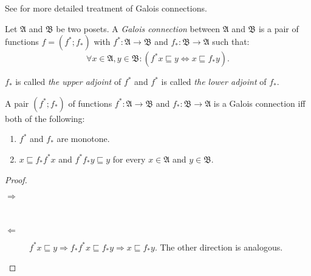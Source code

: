 See \cite{galois-and-fixed,primer-galois} for more detailed treatment
of Galois connections.
\begin{defn}
Let $\mathfrak{A}$ and $\mathfrak{B}$
be two posets. A \emph{Galois connection} between $\mathfrak{A}$
and $\mathfrak{B}$ is a pair of functions $f=(f^{\ast};f_{\ast})$
with $f^{\ast}:\mathfrak{A}\rightarrow\mathfrak{B}$ and $f_{\ast}:\mathfrak{B}\rightarrow\mathfrak{A}$
such that:
\[
\forall x\in\mathfrak{A},y\in\mathfrak{B}:(f^{\ast}x\sqsubseteq y\Leftrightarrow x\sqsubseteq f_{\ast}y).
\]


$f_{\ast}$ is called
\emph{the upper adjoint} of $f^{\ast}$ and $f^{\ast}$ is called
\emph{the lower adjoint} of $f_{\ast}$.\end{defn}
\begin{thm}
\label{galois-second}A pair $(f^{\ast};f_{\ast})$ of functions $f^{\ast}:\mathfrak{A}\rightarrow\mathfrak{B}$
and $f_{\ast}:\mathfrak{B}\rightarrow\mathfrak{A}$ is a Galois connection
iff both of the following: 
\begin{enumerate}
\item \label{galois-second-mono}$f^{\ast}$ and $f_{\ast}$ are monotone.
\item \label{galois-second-ineq}$x\sqsubseteq f_{\ast}f^{\ast}x$ and $f^{\ast}f_{\ast}y\sqsubseteq y$
for every $x\in\mathfrak{A}$ and $y\in\mathfrak{B}$.
\end{enumerate}
\end{thm}
\begin{proof}
~
\begin{description}
\item [{$\Rightarrow$}]~

\item [{$\Leftarrow$}] $f^{\ast}x\sqsubseteq y\Rightarrow f_{\ast}f^{\ast}x\sqsubseteq f_{\ast}y\Rightarrow x\sqsubseteq f_{\ast}y$.
The other direction is analogous.
\end{description}
\end{proof}
